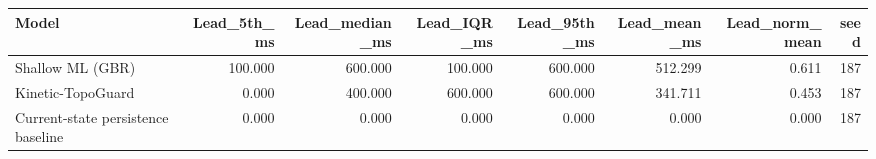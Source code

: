 \begin{tabular}{lrrrrrrr}
\toprule
Model & Lead\_5th\_ms & Lead\_median\_ms & Lead\_IQR\_ms & Lead\_95th\_ms & Lead\_mean\_ms & Lead\_norm\_mean & seed \\
\midrule
Shallow ML (GBR) & 100.000 & 600.000 & 100.000 & 600.000 & 512.299 & 0.611 & 187 \\
Kinetic-TopoGuard & 0.000 & 400.000 & 600.000 & 600.000 & 341.711 & 0.453 & 187 \\
Current-state persistence baseline & 0.000 & 0.000 & 0.000 & 0.000 & 0.000 & 0.000 & 187 \\
\bottomrule
\end{tabular}